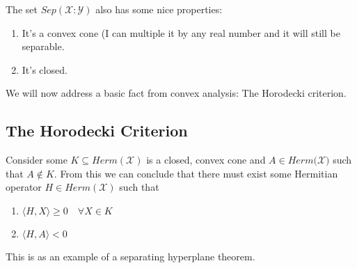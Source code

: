 \documentclass{article}
\begin{document}
The set $Sep(\mathcal{X}:\mathcal{Y})$ also has some nice properties:
\begin{enumerate}
    \item It's a convex cone (I can multiple it by any real number and it will
        still be separable.
    \item It's closed. 
\end{enumerate}

We will now address a basic fact from convex analysis: The Horodecki criterion.

\subsection{The Horodecki Criterion}
Consider some $ K \subseteq Herm(\mathcal{X}) $ is a closed, convex cone and $A
\in Herm(\mathcal{X)}$ such that $A \notin K$. From this we can conclude that
there must exist some Hermitian operator $H \in Herm(\mathcal{X})$ such that
\begin{enumerate}
    \item $\langle H , X \rangle \ge 0 \quad \forall X \in K$
    \item $\langle H , A \rangle < 0$
\end{enumerate}

This is as an example of a separating hyperplane theorem.
\end{document}
